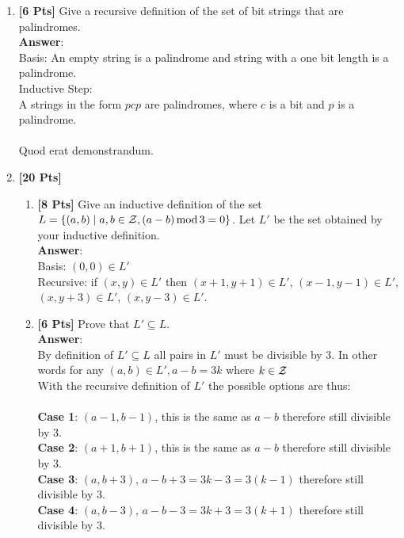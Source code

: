 \begin{enumerate}
\begin{enumerate}
\end{enumerate}

\clearpage

\item {\bf [6 Pts]} Give a recursive definition of the set of bit strings that are palindromes.\\
\textbf{Answer}:\\
Basis: An empty string is a palindrome and string with a one bit length is a palindrome.\\

Inductive Step:\\
A strings in the form $pcp$ are palindromes, where $c$ is a bit and $p$ is a palindrome.\\\\
Quod erat demonstrandum.\\


\item {\bf [20 Pts]} 

\begin{enumerate}

\item {\bf [8 Pts]} Give an inductive definition of the set 
    $L = \{(a,b) \mid a,b \in {\cal Z}, (a-b) \, {\rm mod} \, 3 = 0\}$.
Let $L'$ be the set obtained by your inductive definition.\\
\textbf{Answer}:\\

Basis: $(0,0) \in L'$\\

Recursive: if $(x,y) \in L'$ then $(x+1,y+1) \in L'$, $(x-1,y-1) \in L'$, $(x,y+3) \in L'$, $(x,y-3) \in L'$.\\

\item {\bf [6 Pts]}	Prove that $L' \subseteq L$.\\
\textbf{Answer}:\\

By definition of $L' \subseteq L$ all pairs in $L'$ must be divisible by $3$. In other words for any $(a,b) \in L', a-b = 3k$ where $k \in \cal Z$\\
With the recursive definition of $L'$ the possible options are thus:\\\\

\textbf{Case 1}: $(a-1, b-1)$, this is the same as $a-b$ therefore still divisible by 3.\\
\textbf{Case 2}: $(a+1, b+1)$, this is the same as $a-b$ therefore still divisible by 3.\\
\textbf{Case 3}: $(a, b+3)$, $a - b + 3 = 3k - 3 = 3(k-1)$ therefore still divisible by 3.\\
\textbf{Case 4}: $(a, b-3)$, $a - b - 3 = 3k + 3 = 3(k+1)$ therefore still divisible by 3.\\



\end{enumerate}
\end{enumerate}
